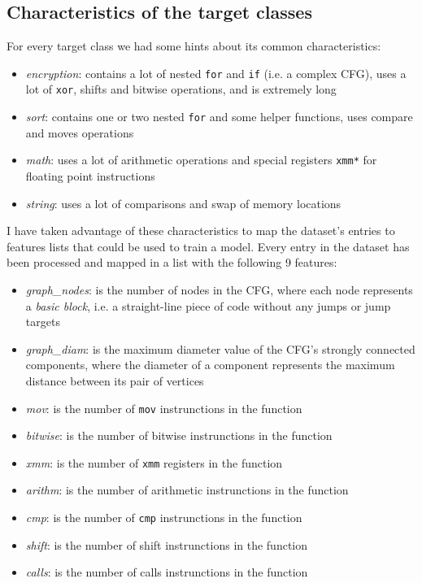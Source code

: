 \documentclass[11pt]{article}
\begin{document}
	\subsection{Characteristics of the target classes} \label{subsec:target-classes}
	For every target class we had some hints about its common characteristics:
	\begin{itemize}
		\item \textit{encryption}: contains a lot of nested \texttt{for} and
		\texttt{if} (i.e. a complex CFG), uses a lot of \texttt{xor}, shifts and
		bitwise operations, and is extremely long
		\item \textit{sort}: contains one or two nested \texttt{for} and some
		helper functions, uses compare and moves operations
		\item \textit{math}: uses a lot of arithmetic operations and special
		registers \texttt{xmm*} for floating point instructions
		\item \textit{string}: uses a lot of comparisons and swap of memory locations
	\end{itemize}
	I have taken advantage of these characteristics to map the dataset's
	entries to features lists that could be used to train a model.
	Every entry in the dataset has been processed and mapped in a list with the
	following 9 features:
	\begin{itemize}
		\item \textit{graph\_nodes}: is the number of nodes in the CFG, where each
		node represents a \textit{basic block}, i.e. a straight-line piece of code
		without any jumps or jump targets
		\item \textit{graph\_diam}: is the maximum diameter value of the CFG's
		strongly connected components, where the diameter of a component represents
		the maximum distance between its pair of vertices
		\item \textit{mov}: is the number of \texttt{mov} instrunctions in the function
		\item \textit{bitwise}: is the number of bitwise instrunctions in the function
		\item \textit{xmm}: is the number of \texttt{xmm} registers in the function
		\item \textit{arithm}: is the number of arithmetic instrunctions in the function
		\item \textit{cmp}: is the number of \texttt{cmp} instrunctions in the function
		\item \textit{shift}: is the number of shift instrunctions in the function
		\item \textit{calls}: is the number of calls instrunctions in the function
	\end{itemize}	
\end{document}
